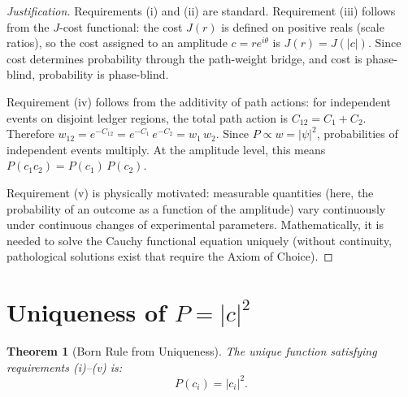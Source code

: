 \documentclass[12pt,a4paper]{article}
\newtheorem{theorem}{Theorem}[section]
\theoremstyle{definition}
\theoremstyle{remark}
\begin{document}
\begin{proof}[Justification]
Requirements (i) and (ii) are standard.  Requirement (iii)
follows from the $J$-cost functional: the cost $J(r)$ is
defined on positive reals (scale ratios), so the cost assigned
to an amplitude $c = re^{i\theta}$ is $J(r) = J(|c|)$.  Since
cost determines probability through the path-weight bridge,
and cost is phase-blind, probability is phase-blind.

Requirement (iv) follows from the additivity of path actions:
for independent events on disjoint ledger regions, the total
path action is $C_{12} = C_1 + C_2$.  Therefore
$w_{12} = e^{-C_{12}} = e^{-C_1}\,e^{-C_2} = w_1\,w_2$.
Since $P \propto w = |\psi|^2$, probabilities of independent
events multiply.  At the amplitude level, this means
$P(c_1 c_2) = P(c_1)\,P(c_2)$.

Requirement (v) is physically motivated: measurable quantities
(here, the probability of an outcome as a function of the
amplitude) vary continuously under continuous changes of
experimental parameters.  Mathematically, it is needed to
solve the Cauchy functional equation uniquely (without
continuity, pathological solutions exist that require the
Axiom of Choice).
\end{proof}

\section{Uniqueness of $P = |c|^2$}
\label{sec:uniqueness}

\begin{theorem}[Born Rule from Uniqueness]
\label{thm:born}
The unique function satisfying requirements (i)--(v) is:
\begin{equation}
  \boxed{P(c_i) = |c_i|^2.}
\end{equation}
\end{theorem}
\end{document}
